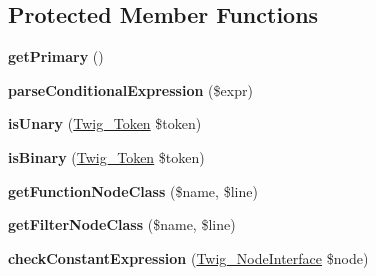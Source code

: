 \subsection*{Protected Member Functions}
\begin{DoxyCompactItemize}
\item 
{\bfseries get\+Primary} ()\hypertarget{classTwig__ExpressionParser_a8d99f5296efba4e223c759097dea094c}{}\label{classTwig__ExpressionParser_a8d99f5296efba4e223c759097dea094c}

\item 
{\bfseries parse\+Conditional\+Expression} (\$expr)\hypertarget{classTwig__ExpressionParser_a56a1635594f557f760aedad7fd70f0ad}{}\label{classTwig__ExpressionParser_a56a1635594f557f760aedad7fd70f0ad}

\item 
{\bfseries is\+Unary} (\hyperlink{classTwig__Token}{Twig\+\_\+\+Token} \$token)\hypertarget{classTwig__ExpressionParser_a306d5d39a56b02cf2fc20b3f7f43c6bf}{}\label{classTwig__ExpressionParser_a306d5d39a56b02cf2fc20b3f7f43c6bf}

\item 
{\bfseries is\+Binary} (\hyperlink{classTwig__Token}{Twig\+\_\+\+Token} \$token)\hypertarget{classTwig__ExpressionParser_af6bdd7b3e1ea86fd95de8c54a6359e11}{}\label{classTwig__ExpressionParser_af6bdd7b3e1ea86fd95de8c54a6359e11}

\item 
{\bfseries get\+Function\+Node\+Class} (\$name, \$line)\hypertarget{classTwig__ExpressionParser_a07f8faf5aa26a38280a1cbe6a749d398}{}\label{classTwig__ExpressionParser_a07f8faf5aa26a38280a1cbe6a749d398}

\item 
{\bfseries get\+Filter\+Node\+Class} (\$name, \$line)\hypertarget{classTwig__ExpressionParser_a7f0faf1044742d8bcbeb965546522213}{}\label{classTwig__ExpressionParser_a7f0faf1044742d8bcbeb965546522213}

\item 
{\bfseries check\+Constant\+Expression} (\hyperlink{interfaceTwig__NodeInterface}{Twig\+\_\+\+Node\+Interface} \$node)\hypertarget{classTwig__ExpressionParser_abc024c1e0ef20f28b2e353b4dfb51645}{}\label{classTwig__ExpressionParser_abc024c1e0ef20f28b2e353b4dfb51645}

\end{DoxyCompactItemize}
